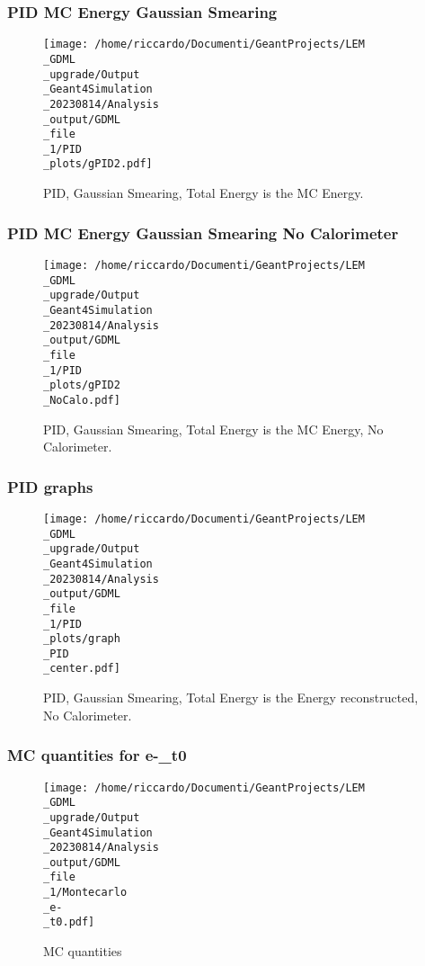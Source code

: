 \documentclass[8pt]{beamer}
\begin{document}
            \begin{frame}
                \frametitle{PID MC Energy Gaussian Smearing}
            
        \begin{figure}[h]
            \centering
            \texttt{[image: /home/riccardo/Documenti/GeantProjects/LEM\\\_GDML\\\_upgrade/Output\\\_Geant4Simulation\\\_20230814/Analysis\\\_output/GDML\\\_file\\\_1/PID\\\_plots/gPID2.pdf]}
            \caption{PID, Gaussian Smearing, Total Energy is the MC Energy.}
        \end{figure}
        
            \end{frame}
            
            \begin{frame}
                \frametitle{PID MC Energy Gaussian Smearing No Calorimeter}
            
        \begin{figure}[h]
            \centering
            \texttt{[image: /home/riccardo/Documenti/GeantProjects/LEM\\\_GDML\\\_upgrade/Output\\\_Geant4Simulation\\\_20230814/Analysis\\\_output/GDML\\\_file\\\_1/PID\\\_plots/gPID2\\\_NoCalo.pdf]}
            \caption{PID, Gaussian Smearing, Total Energy is the MC Energy, No Calorimeter.}
        \end{figure}
        
            \end{frame}
            
            \begin{frame}
                \frametitle{PID graphs}
            
        \begin{figure}[h]
            \centering
            \texttt{[image: /home/riccardo/Documenti/GeantProjects/LEM\\\_GDML\\\_upgrade/Output\\\_Geant4Simulation\\\_20230814/Analysis\\\_output/GDML\\\_file\\\_1/PID\\\_plots/graph\\\_PID\\\_center.pdf]}
            \caption{PID, Gaussian Smearing, Total Energy is the Energy reconstructed, No Calorimeter.}
        \end{figure}
        
            \end{frame}
            
            \begin{frame}
                \frametitle{MC quantities for e-\_t0}
            
        \begin{figure}[h]
            \centering
            \texttt{[image: /home/riccardo/Documenti/GeantProjects/LEM\\\_GDML\\\_upgrade/Output\\\_Geant4Simulation\\\_20230814/Analysis\\\_output/GDML\\\_file\\\_1/Montecarlo\\\_e-\\\_t0.pdf]}
            \caption{MC quantities}
        \end{figure}
        
            \end{frame}
            
\end{document}
